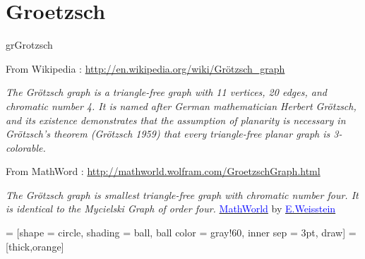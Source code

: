 \newpage\section{Groetzsch}
\begin{NewMacroBox}{grGrotzsch}{}

\medskip
From  Wikipedia : \url{http://en.wikipedia.org/wiki/Grötzsch_graph}  

\emph{The Grötzsch graph is a triangle-free graph with 11 vertices, 20 edges, and chromatic number 4. It is named after German mathematician Herbert Grötzsch, and its existence demonstrates that the assumption of planarity is necessary in Grötzsch's theorem (Grötzsch 1959) that every triangle-free planar graph is 3-colorable.}

\medskip
From MathWord : \url{http://mathworld.wolfram.com/GroetzschGraph.html} 

\emph{The Grötzsch graph is smallest triangle-free graph with chromatic number four. It is identical to the Mycielski Graph of order four.}
\href{http://mathworld.wolfram.com/topics/GraphTheory.html}%
           {\textcolor{blue}{MathWorld}} by \href{http://en.wikipedia.org/wiki/Eric_W._Weisstein}%
           {\textcolor{blue}{E.Weisstein}} 

\end{NewMacroBox}


 = [shape           = circle,
                           shading         = ball,
                           ball color      = gray!60,
                           inner sep       = 3pt,
                           draw]
\SetVertexNoLabel
{}        = [thick,orange] 

\subsection{}

\begin{center}
    \begin{tkzexample}[vbox]
\end{tkzexample} 
\end{center}


